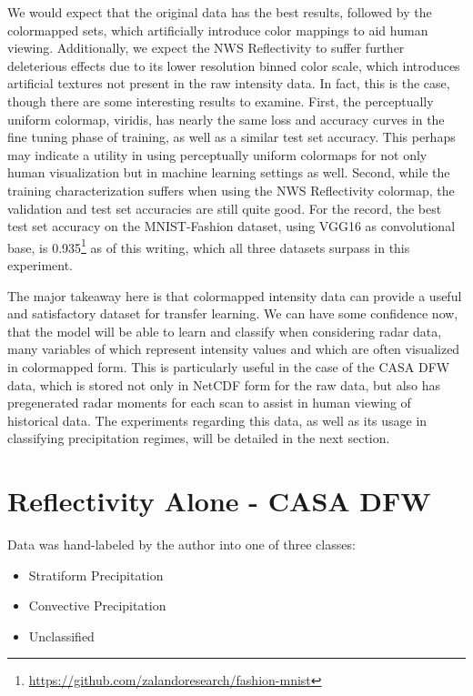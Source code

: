 We would expect that the original data has the best results, followed by the colormapped sets, which artificially introduce color mappings to aid human viewing.
Additionally, we expect the NWS Reflectivity to suffer further deleterious effects due to its lower resolution binned color scale, which introduces artificial textures not present in the raw intensity data.
In fact, this is the case, though there are some interesting results to examine.
First, the perceptually uniform colormap, viridis, has nearly the same loss and accuracy curves in the fine tuning phase of training, as well as a similar test set accuracy.
This perhaps may indicate a utility in using perceptually uniform colormaps for not only human visualization but in machine learning settings as well.
Second, while the training characterization suffers when using the NWS Reflectivity colormap, the validation and test set accuracies are still quite good.
For the record, the best test set accuracy on the MNIST-Fashion dataset, using VGG16 as
convolutional base, is 0.935\footnote{\url{https://github.com/zalandoresearch/fashion-mnist}} as of this writing, which all three datasets surpass in this experiment.

The major takeaway here is that colormapped intensity data can provide a useful and satisfactory dataset for transfer learning.
We can have some confidence now, that the model will be able to learn and classify when considering radar data, many variables of which represent intensity values and which are often visualized in colormapped form.
This is particularly useful in the case of the CASA DFW data, which is stored not only in NetCDF form for the raw data, but also has pregenerated radar moments for each scan to assist in human viewing of historical data.
The experiments regarding this data, as well as its usage in classifying precipitation regimes, will be detailed in the next section.

\section{Reflectivity Alone - CASA DFW}
\label{sec:classifying_zhcasa}

Data was hand-labeled by the author into one of three classes:

\begin{itemize}
	\item Stratiform Precipitation
	\item Convective Precipitation
	\item Unclassified
\end{itemize}

